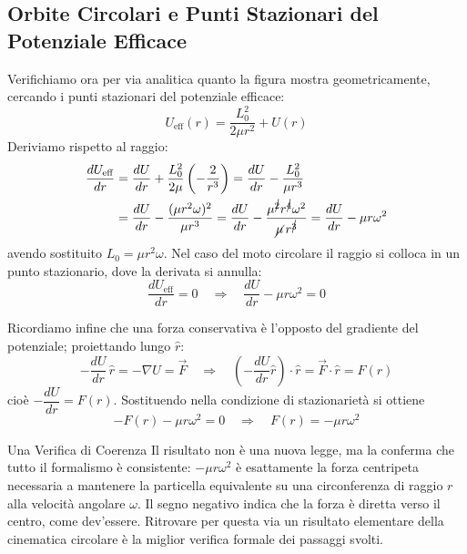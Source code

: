 \subsection{Orbite Circolari e Punti Stazionari del Potenziale Efficace}

Verifichiamo ora per via analitica quanto la figura mostra geometricamente, cercando i punti stazionari del potenziale efficace:
\begin{equation}
    U_{\text{eff}}(r) = \frac{L_0^2}{2\mu r^2} + U(r)
\end{equation}
Deriviamo rispetto al raggio:
\begin{align}
    \frac{dU_{\text{eff}}}{dr}
    &= \frac{dU}{dr} + \frac{L_0^2}{2\mu} \left( -\frac{2}{r^3} \right)
     = \frac{dU}{dr} - \frac{L_0^2}{\mu r^3} \\
    &= \frac{dU}{dr} - \frac{(\mu r^2 \omega)^2}{\mu r^3}
     = \frac{dU}{dr} - \frac{\mu^{\cancel{2}} r^{\cancel{4}} \omega^2}{\cancel{\mu} \, r^{\cancel{3}}}
     = \frac{dU}{dr} - \mu r \omega^2
\end{align}
avendo sostituito $L_0 = \mu r^2 \omega$. Nel caso del moto circolare il raggio si colloca in un punto stazionario, dove la derivata si annulla:
\begin{equation}
    \frac{dU_{\text{eff}}}{dr} = 0
    \quad \Longrightarrow \quad
    \frac{dU}{dr} - \mu r \omega^2 = 0
\end{equation}

Ricordiamo infine che una forza conservativa è l'opposto del gradiente del potenziale; proiettando lungo $\hat{r}$:
\begin{equation}
    -\frac{dU}{dr}\,\hat{r} = -\nabla U = \vec{F}
    \quad \Longrightarrow \quad
    \left(-\frac{dU}{dr}\hat{r}\right) \cdot \hat{r} = \vec{F} \cdot \hat{r} = F(r)
\end{equation}
cioè $-\dfrac{dU}{dr} = F(r)$. Sostituendo nella condizione di stazionarietà si ottiene
\begin{equation}
    -F(r) - \mu r \omega^2 = 0
    \quad \Longrightarrow \quad
    F(r) = - \mu r \omega^2
\end{equation}

\begin{osservazione}{Una Verifica di Coerenza}
Il risultato non è una nuova legge, ma la conferma che tutto il formalismo è consistente: $-\mu r\omega^2$ è esattamente la forza centripeta necessaria a mantenere la particella equivalente su una circonferenza di raggio $r$ alla velocità angolare $\omega$. Il segno negativo indica che la forza è diretta verso il centro, come dev'essere. Ritrovare per questa via un risultato elementare della cinematica circolare è la miglior verifica formale dei passaggi svolti.
\end{osservazione}

